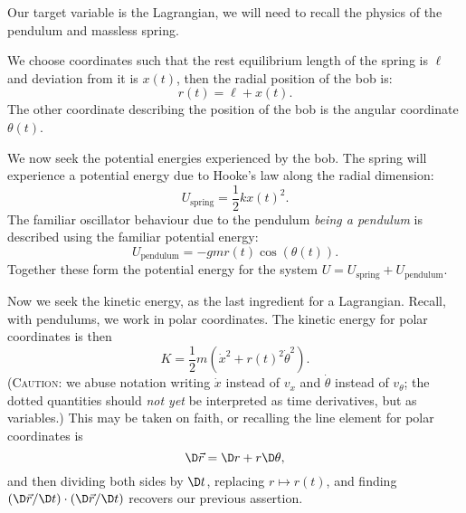Our target variable is the Lagrangian, we will need to recall the
physics of the pendulum and massless spring.

We choose coordinates such that the rest equilibrium length of the
spring is $\ell$ and deviation from it is $x(t)$, then the radial
position of the bob is:
\begin{equation}
r(t) = \ell + x(t).
\end{equation}
The other coordinate describing the position of the bob is the angular
coordinate $\theta(t)$.

We now seek the potential energies experienced by the bob.
The spring will experience a potential energy due to Hooke's law along
the radial dimension: 
\begin{equation}
U_{\text{spring}} = \frac{1}{2}kx(t)^{2}.
\end{equation}
The familiar oscillator behaviour due to the pendulum \emph{being a pendulum}
is described using the familiar potential energy:
\begin{equation}
U_{\text{pendulum}} = -gmr(t)\cos(\theta(t)).
\end{equation}
Together these form the potential energy for the system
$U = U_{\text{spring}} + U_{\text{pendulum}}$.

Now we seek the kinetic energy, as the last ingredient for a
Lagrangian. Recall, with pendulums, we work in polar coordinates.
The kinetic energy for polar coordinates is then
\begin{equation}
K = \frac{1}{2}m(\dot{x}^{2} + r(t)^{2}\dot{\theta}^{2}).
\end{equation}
(\textsc{Caution:} we abuse notation writing $\dot{x}$ instead of
$v_{x}$ and $\dot{\theta}$ instead of $v_{\theta}$; the dotted
quantities should \emph{not yet} be interpreted as time derivatives, but
as variables.)
This may be taken on faith, or recalling the line element for polar
coordinates is
\begin{equation}
\D\vec{r} = \D r + r\D\theta,
\end{equation}
and then dividing both sides by $\D t$, replacing $r\mapsto r(t)$, and
finding $(\D\vec{r}/\D t)\cdot(\D\vec{r}/\D t)$ recovers our previous
assertion.

